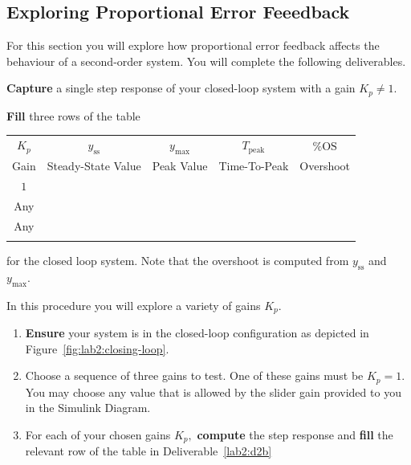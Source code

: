 \subsection{Exploring Proportional Error Feeedback}
For this section you will explore how proportional error feedback affects
the behaviour of a second-order system. You will complete the following
deliverables.
%
\begin{deliverable}[label={lab2:d2}]
  \textbf{Capture} a single step response of your closed-loop system
  with a gain \(K_p \neq 1.\)
\end{deliverable}
%
\begin{deliverable}[label={lab2:d2b}]
  \textbf{Fill} three rows of the table
  \begin{center}
  \begin{tabular}{c|c|c|c|c}
    \(K_p\)
      & \(y_\mathrm{ss}\)
      & \(y_\mathrm{max}\)
      & \(T_\mathrm{peak}\)
      & \(\%\mathrm{OS}\) \\
    Gain
      & Steady-State Value
      & Peak Value
      & Time-To-Peak
      & Overshoot \\ \hline
    \(1\) & & & & \\ \hline
    Any & & & & \\ \hline
    Any & & & & \\ \hline
    & & & &
  \end{tabular}
  \end{center}
  for the closed loop system.
  Note that the overshoot is computed from \(y_\mathrm{ss}\) and
  \(y_\mathrm{max}.\)
\end{deliverable}

%
\begin{procedure}[label={proc:lab2:p2}]
  In this procedure you will explore a variety of gains \(K_p.\)
  \begin{enumerate}[label=(\arabic*)]
    \item{
      \textbf{Ensure} your system is in the closed-loop configuration
      as depicted in Figure~\ref{fig:lab2:closing-loop}.
    }
    \item{
      Choose a sequence of three gains to test. One of these gains
      must be \(K_p = 1.\) You may choose any value that is allowed by
      the slider gain provided to you in the Simulink Diagram.
    }
    \item{
      For each of your chosen gains \(K_p,\) \textbf{compute} the step
      response and \textbf{fill} the relevant row of the table
      in Deliverable~\ref{lab2:d2b}
    }
  \end{enumerate}
\end{procedure}

